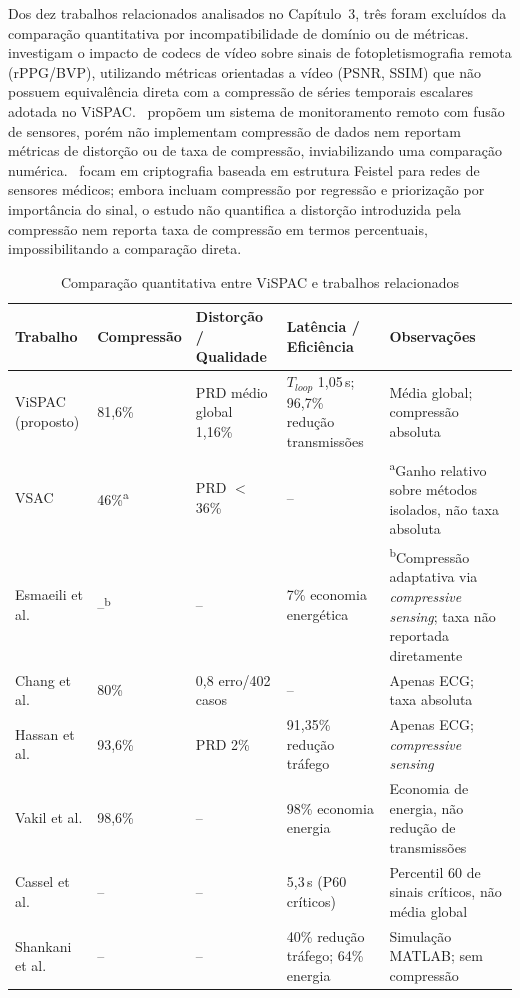 \documentclass[twoside,english,brazilian]{UNISINOSmonografia}
\begin{document}
Dos dez trabalhos relacionados analisados no Capítulo~3, três foram excluídos da comparação quantitativa por incompatibilidade de domínio ou de métricas.~\cite{Zhou2025} investigam o impacto de codecs de vídeo sobre sinais de fotopletismografia remota (rPPG/BVP), utilizando métricas orientadas a vídeo (PSNR, SSIM) que não possuem equivalência direta com a compressão de séries temporais escalares adotada no ViSPAC.~\cite{MOHAPATRA2025} propõem um sistema de monitoramento remoto com fusão de sensores, porém não implementam compressão de dados nem reportam métricas de distorção ou de taxa de compressão, inviabilizando uma comparação numérica.~\cite{TAO2025} focam em criptografia baseada em estrutura Feistel para redes de sensores médicos; embora incluam compressão por regressão e priorização por importância do sinal, o estudo não quantifica a distorção introduzida pela compressão nem reporta taxa de compressão em termos percentuais, impossibilitando a comparação direta.

\begin{table}[!ht]
\centering
\caption{Comparação quantitativa entre ViSPAC e trabalhos relacionados}
\label{tab:comparacao_trs}
\footnotesize
\begin{tabular}{|p{2.8cm}|p{2cm}|p{2.5cm}|p{3cm}|p{3.5cm}|}
\hline
\textbf{Trabalho} & \textbf{Compressão} & \textbf{Distorção / Qualidade} & \textbf{Latência / Eficiência} & \textbf{Observações} \\ \hline
ViSPAC (proposto) & 81,6\% & PRD médio global 1,16\% & $T_{loop}$ 1,05\,s; 96,7\% redução transmissões & Média global; compressão absoluta \\ \hline
VSAC \cite{Andrade2025} & 46\%\textsuperscript{a} & PRD $<$ 36\% & -- & \textsuperscript{a}Ganho relativo sobre métodos isolados, não taxa absoluta \\ \hline
Esmaeili et al. \cite{ESMAEILI2023} & --\textsuperscript{b} & -- & 7\% economia energética & \textsuperscript{b}Compressão adaptativa via \textit{compressive sensing}; taxa não reportada diretamente \\ \hline
Chang et al. \cite{Chang2024} & 80\% & 0,8 erro/402 casos & -- & Apenas ECG; taxa absoluta \\ \hline
Hassan et al. \cite{Hassan2024} & 93,6\% & PRD 2\% & 91,35\% redução tráfego & Apenas ECG; \textit{compressive sensing} \\ \hline
Vakil et al. \cite{Vakil2024} & 98,6\% & -- & 98\% economia energia & Economia de energia, não redução de transmissões \\ \hline
Cassel et al. \cite{CASSEL2024} & -- & -- & 5,3\,s (P60 críticos) & Percentil 60 de sinais críticos, não média global \\ \hline
Shankani et al. \cite{Shankani2025} & -- & -- & 40\% redução tráfego; 64\% energia & Simulação MATLAB; sem compressão \\ \hline
\end{tabular}
\end{table}
\end{document}

